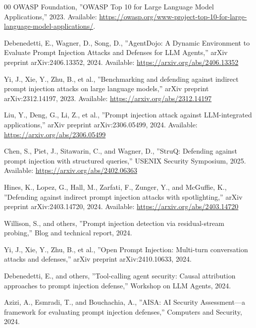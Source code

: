\documentclass[manuscript,screen,review]{acmart}
\begin{document}
\begin{thebibliography}{00}
 OWASP Foundation, ''OWASP Top 10 for Large Language Model Applications,'' 2023. Available: \url{https://owasp.org/www-project-top-10-for-large-language-model-applications/}.

 Debenedetti, E., Wagner, D., Song, D., ''AgentDojo: A Dynamic Environment to Evaluate Prompt Injection Attacks and Defenses for LLM Agents,'' arXiv preprint arXiv:2406.13352, 2024. Available: \url{https://arxiv.org/abs/2406.13352}


 Yi, J., Xie, Y., Zhu, B., et al., ''Benchmarking and defending against indirect prompt injection attacks on large language models,'' arXiv preprint arXiv:2312.14197, 2023. Available: \url{https://arxiv.org/abs/2312.14197}

 Liu, Y., Deng, G., Li, Z., et al., ''Prompt injection attack against LLM-integrated applications,'' arXiv preprint arXiv:2306.05499, 2024. Available: \url{https://arxiv.org/abs/2306.05499}

 Chen, S., Piet, J., Sitawarin, C., and Wagner, D., ''StruQ: Defending against prompt injection with structured queries,'' USENIX Security Symposium, 2025. Available: \url{https://arxiv.org/abs/2402.06363}

 Hines, K., Lopez, G., Hall, M., Zarfati, F., Zunger, Y., and McGuffie, K., ''Defending against indirect prompt injection attacks with spotlighting,'' arXiv preprint arXiv:2403.14720, 2024. Available: \url{https://arxiv.org/abs/2403.14720}

 Willison, S., and others, ''Prompt injection detection via residual-stream probing,'' Blog and technical report, 2024.

 Yi, J., Xie, Y., Zhu, B., et al., ''Open Prompt Injection: Multi-turn conversation attacks and defenses,'' arXiv preprint arXiv:2410.10633, 2024.

 Debenedetti, E., and others, ''Tool-calling agent security: Causal attribution approaches to prompt injection defense,'' Workshop on LLM Agents, 2024.

 Azizi, A., Esmradi, T., and Bouchachia, A., ''AISA: AI Security Assessment—a framework for evaluating prompt injection defenses,'' Computers and Security, 2024.

\end{thebibliography}


\appendix
\end{document}
